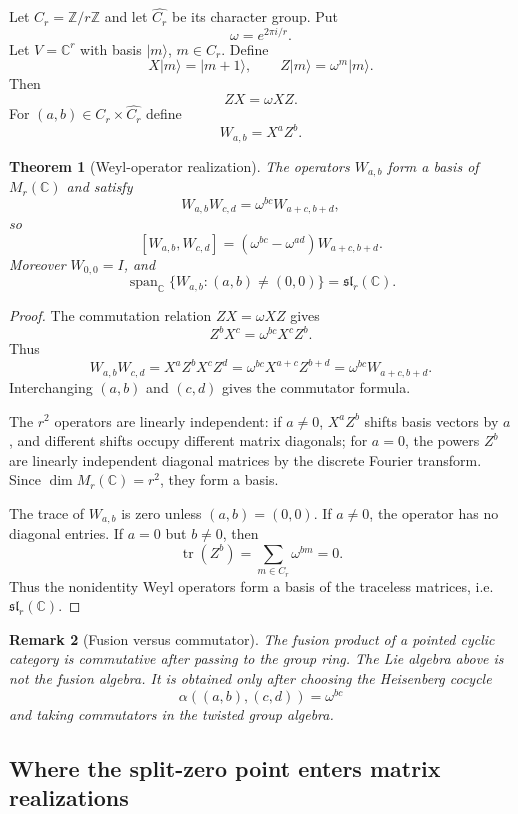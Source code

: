 \documentclass[11pt]{amsart}
\newtheorem{theorem}{Theorem}[section]
\newtheorem{remark}[theorem]{Remark}
\DeclareMathOperator{\tr}{tr}
\DeclareMathOperator{\Span}{span}
\newcommand{\ZZ}{\mathbb Z}
\newcommand{\CC}{\mathbb C}
\begin{document}
Let $C_r=\ZZ/r\ZZ$ and let $\widehat{C_r}$ be its character group.  Put
\[
       \omega=e^{2\pi i/r}.
\]
Let $V=\CC^r$ with basis $|m\rangle$, $m\in C_r$.  Define
\[
       X|m\rangle=|m+1\rangle,
       \qquad
       Z|m\rangle=\omega^m|m\rangle.
\]
Then
\[
       ZX=\omega XZ.
\]
For $(a,b)\in C_r\times\widehat{C_r}$ define
\[
       W_{a,b}=X^aZ^b.
\]

\begin{theorem}[Weyl-operator realization]
The operators $W_{a,b}$ form a basis of $M_r(\CC)$ and satisfy
\[
       W_{a,b}W_{c,d}=\omega^{bc}W_{a+c,b+d},
\]
so
\[
       [W_{a,b},W_{c,d}]
       =(\omega^{bc}-\omega^{ad})W_{a+c,b+d}.
\]
Moreover $W_{0,0}=I$, and
\[
       \Span_\CC\{W_{a,b}:(a,b)\ne(0,0)\}=\mathfrak{sl}_r(\CC).
\]
\end{theorem}

\begin{proof}
The commutation relation $ZX=\omega XZ$ gives
\[
       Z^bX^c=\omega^{bc}X^cZ^b.
\]
Thus
\[
       W_{a,b}W_{c,d}=X^aZ^bX^cZ^d=\omega^{bc}X^{a+c}Z^{b+d}=\omega^{bc}W_{a+c,b+d}.
\]
Interchanging $(a,b)$ and $(c,d)$ gives the commutator formula.

The $r^2$ operators are linearly independent: if $a\ne0$, $X^aZ^b$ shifts basis vectors by $a$, and different shifts occupy different matrix diagonals; for $a=0$, the powers $Z^b$ are linearly independent diagonal matrices by the discrete Fourier transform.  Since $\dim M_r(\CC)=r^2$, they form a basis.

The trace of $W_{a,b}$ is zero unless $(a,b)=(0,0)$.  If $a\ne0$, the operator has no diagonal entries.  If $a=0$ but $b\ne0$, then
\[
       \tr(Z^b)=\sum_{m\in C_r}\omega^{bm}=0.
\]
Thus the nonidentity Weyl operators form a basis of the traceless matrices, i.e. $\mathfrak{sl}_r(\CC)$.\end{proof}

\begin{remark}[Fusion versus commutator]
The fusion product of a pointed cyclic category is commutative after passing to the group ring.  The Lie algebra above is not the fusion algebra.  It is obtained only after choosing the Heisenberg cocycle
\[
       \alpha((a,b),(c,d))=\omega^{bc}
\]
and taking commutators in the twisted group algebra.
\end{remark}

\subsection{Where the split-zero point enters matrix realizations}
\end{document}
